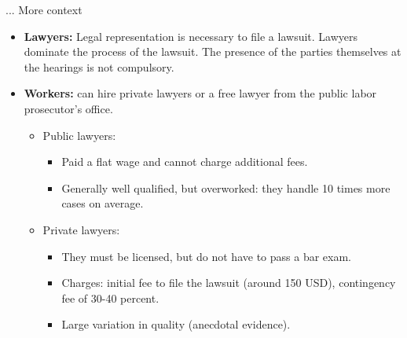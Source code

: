\documentclass[9pt]{beamer}
\begin{document}
     
\begin{frame}{... More context}
    \begin{itemize}     
       \item \textbf{Lawyers:} Legal representation is necessary to file a lawsuit. Lawyers dominate the process of the lawsuit. The presence of the parties themselves at the hearings is not compulsory. 
       \vspace{0.05in}
       
        \item   \textbf{Workers:} can hire private lawyers or a free lawyer from the public labor prosecutor's office.
        \vspace{0.05in}
            \begin{itemize}
                \item Public lawyers:
                \begin{itemize}
                    \item Paid a flat wage and cannot charge additional fees.
                    \item Generally well qualified, but overworked: they handle 10 times more cases on average.
                \end{itemize}
                \vspace{0.05in}
                \item Private lawyers:
                \begin{itemize}
                    \item They must be licensed, but do not have to pass a bar exam.
                    \item Charges: initial fee to file the lawsuit (around 150 USD), contingency fee of 30-40 percent.
                    \item Large variation in quality (anecdotal evidence).
                \end{itemize} 
            \end{itemize}

    \end{itemize}
\end{frame}
\end{document}
